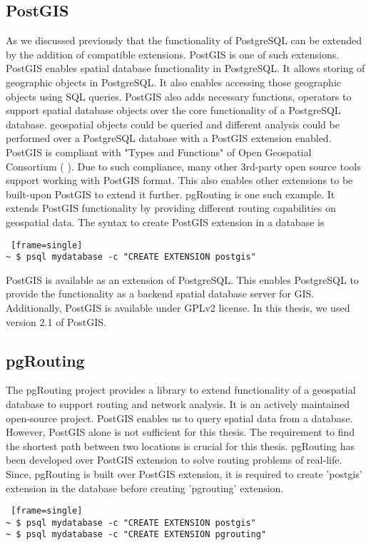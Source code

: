 \subsection{PostGIS}\label{postgis}
As we discussed previously that the functionality of PostgreSQL can be extended by the addition of compatible extensions. PostGIS \cite{holl2009postgis} is one of such extensions. PostGIS enables spatial database functionality in PostgreSQL. It allows storing of geographic objects in PostgreSQL. It also enables accessing those geographic objects using SQL queries. PostGIS also adds necessary functions, operators to support spatial database objects over the core functionality of a PostgreSQL database. geospatial objects could be queried and different analysis could be performed over a PostgreSQL database with a PostGIS extension enabled.  \\

PostGIS is compliant with "Types and Functions" of Open Geospatial Consortium ( \citet{lupp2008open} ). Due to such compliance, many other 3rd-party open source tools support working with PostGIS format. This also enables other extensions to be built-upon PostGIS to extend it further. pgRouting is one such example. It extends PostGIS functionality by providing different routing capabilities on geospatial data. The syntax to create PostGIS extension in a database is 
\begin{lstlisting} [frame=single]
~ $ psql mydatabase -c "CREATE EXTENSION postgis"
\end{lstlisting}


PostGIS is available as an extension of PostgreSQL. This enables PostgreSQL to provide the functionality as a backend spatial database server for GIS. Additionally, PostGIS is available under GPLv2 license. In this thesis, we used version {2.1} of PostGIS.
\subsection{pgRouting} \label{pgrouting}
The pgRouting project \cite{pgrouting} provides a library to extend functionality of a geospatial database to support routing and network analysis. It is an actively maintained open-source project. PostGIS enables us to query spatial data from a database. However, PostGIS alone is not sufficient for this thesis. The requirement to find the shortest path between two locations is crucial for this thesis. pgRouting has been developed over PostGIS extension to solve routing problems of real-life. Since, pgRouting is built over PostGIS extension, it is required to create 'postgis' extension in the database before creating 'pgrouting' extension. 
\begin{lstlisting} [frame=single]
~ $ psql mydatabase -c "CREATE EXTENSION postgis"
~ $ psql mydatabase -c "CREATE EXTENSION pgrouting"
\end{lstlisting}

